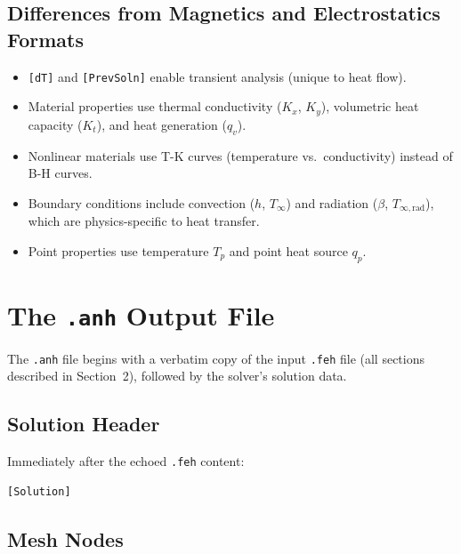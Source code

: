 \documentclass[11pt]{article}
\begin{document}
\subsection{Differences from Magnetics and Electrostatics Formats}

\begin{itemize}
  \item \texttt{[dT]} and \texttt{[PrevSoln]} enable transient analysis
        (unique to heat flow).
  \item Material properties use thermal conductivity ($K_x$, $K_y$),
        volumetric heat capacity ($K_t$), and heat generation ($q_v$).
  \item Nonlinear materials use T-K curves (temperature vs.\
        conductivity) instead of B-H curves.
  \item Boundary conditions include convection ($h$, $T_\infty$) and
        radiation ($\beta$, $T_{\infty,\text{rad}}$), which are
        physics-specific to heat transfer.
  \item Point properties use temperature $T_p$ and point heat
        source $q_p$.
\end{itemize}


\section{The \texttt{.anh} Output File}

The \texttt{.anh} file begins with a verbatim copy of the input
\texttt{.feh} file (all sections described in Section~2), followed by
the solver's solution data.

\subsection{Solution Header}

Immediately after the echoed \texttt{.feh} content:

\begin{lstlisting}
[Solution]
\end{lstlisting}

\subsection{Mesh Nodes}
\end{document}
